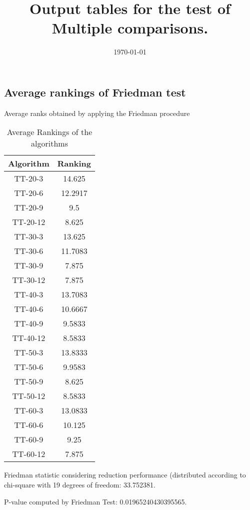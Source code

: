 \documentclass[a4paper,10pt]{article}
\title{Output tables for the test of Multiple comparisons.}
\author{}
\date{\today}
\begin{document}
\begin{landscape}
\pagestyle{empty}
\maketitle
\thispagestyle{empty}
\section{Average rankings of Friedman test}



Average ranks obtained by applying the Friedman procedure

\begin{table}[!htp]
\centering
\begin{tabular}{|c|c|}\hline
Algorithm&Ranking\\\hline
TT-20-3 & 14.625\\
TT-20-6 & 12.2917\\
TT-20-9 & 9.5\\
TT-20-12 & 8.625\\
TT-30-3 & 13.625\\
TT-30-6 & 11.7083\\
TT-30-9 & 7.875\\
TT-30-12 & 7.875\\
TT-40-3 & 13.7083\\
TT-40-6 & 10.6667\\
TT-40-9 & 9.5833\\
TT-40-12 & 8.5833\\
TT-50-3 & 13.8333\\
TT-50-6 & 9.9583\\
TT-50-9 & 8.625\\
TT-50-12 & 8.5833\\
TT-60-3 & 13.0833\\
TT-60-6 & 10.125\\
TT-60-9 & 9.25\\
TT-60-12 & 7.875\\
\hline
\end{tabular}
\caption{Average Rankings of the algorithms}
\end{table}

Friedman statistic considering reduction performance (distributed according to chi-square with 19 degrees of freedom: 33.752381.

P-value computed by Friedman Test: 0.01965240430395565.\newline



\pagebreak


\end{landscape}
\end{document}
